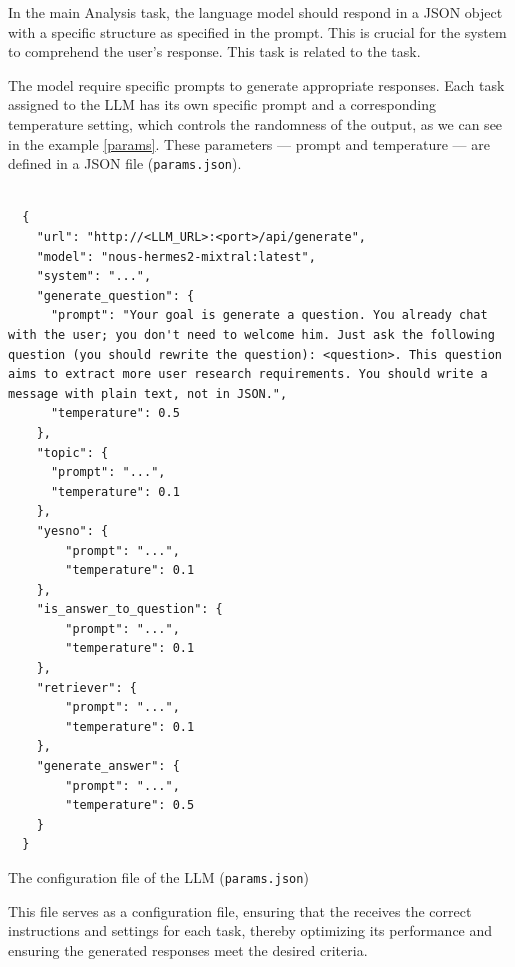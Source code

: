 In the main Analysis task, the language model should respond in a JSON object with a specific structure as specified in the prompt. This is crucial for the system to comprehend the user's response. This task is related to the {\nlu} task.


The model require specific prompts to generate appropriate responses. Each task assigned to the LLM has its own specific prompt and a corresponding temperature setting, which controls the randomness of the output, as we can see in the example \ref{params}. These parameters — prompt and temperature — are defined in a JSON file {\small\normalfont(\texttt{params.json})}. 

\begin{listing}[H]
  \begin{verbatim}
      
  {
    "url": "http://<LLM_URL>:<port>/api/generate",
    "model": "nous-hermes2-mixtral:latest",
    "system": "...",
    "generate_question": {
      "prompt": "Your goal is generate a question. You already chat with the user; you don't need to welcome him. Just ask the following question (you should rewrite the question): <question>. This question aims to extract more user research requirements. You should write a message with plain text, not in JSON.",
      "temperature": 0.5
    },
    "topic": {
      "prompt": "...",
      "temperature": 0.1
    },
    "yesno": {
        "prompt": "...",
        "temperature": 0.1
    },
    "is_answer_to_question": {
        "prompt": "...",
        "temperature": 0.1
    },
    "retriever": {
        "prompt": "...",
        "temperature": 0.1
    },
    "generate_answer": {
        "prompt": "...",
        "temperature": 0.5
    }
  }
  \end{verbatim}
  \caption{The configuration file of the LLM {\small\normalfont(\texttt{params.json})}}
  \label{params}
\end{listing}

This file serves as a configuration file, ensuring that the {\llm} receives the correct instructions and settings for each task, thereby optimizing its performance and ensuring the generated responses meet the desired criteria.





